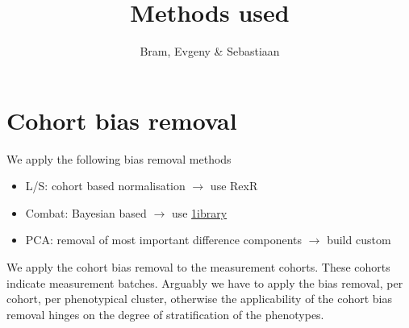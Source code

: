 \documentclass[a4paper,10pt]{article}
\title{Methods used}
\author{Bram, Evgeny \& Sebastiaan}
\begin{document}
\section{Cohort bias removal}
%
We apply the following bias removal methods
%
\begin{itemize}
\item L/S: cohort based normalisation $\rightarrow$ use RexR
\item Combat: Bayesian based $\rightarrow$ use \href{http://www.bu.edu/jlab/wp-assets/ComBat/Abstract.html}{1ibrary} 
\item PCA: removal of most important difference components $\rightarrow$ build custom
\end{itemize}

We apply the cohort bias removal to the measurement cohorts. These cohorts indicate measurement batches.
%
Arguably we have to apply the bias removal, per cohort, per phenotypical cluster, otherwise
the applicability of the cohort bias removal hinges on the degree of stratification of the phenotypes.



\end{document}
